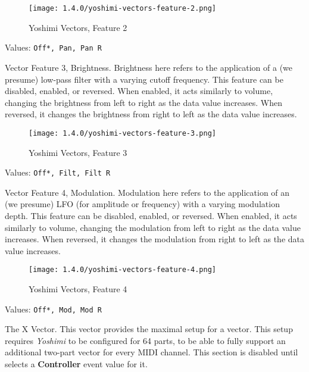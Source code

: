 \begin{figure}[H]
   \centering 
   \texttt{[image: 1.4.0/yoshimi-vectors-feature-2.png]}
   \caption{Yoshimi Vectors, Feature 2}
   \label{fig:yoshimi_vectors_feature_2}
\end{figure}

   Values: \texttt{Off*, Pan, Pan R}

   Vector Feature 3, Brightness.
   Brightness here refers to the application of a (we presume) low-pass filter
   with a varying cutoff frequency.
   This feature can be disabled, enabled, or reversed.
   When enabled, it acts similarly to volume, changing the brightness
   from left to right as the data value increases.
   When reversed, it changes the brightness from right to left as the data
   value increases.

\begin{figure}[H]
   \centering 
   \texttt{[image: 1.4.0/yoshimi-vectors-feature-3.png]}
   \caption{Yoshimi Vectors, Feature 3}
   \label{fig:yoshimi_vectors_feature_3}
\end{figure}

   Values: \texttt{Off*, Filt, Filt R}

   Vector Feature 4, Modulation.
   Modulation here refers to the application of an (we presume) LFO
   (for amplitude or frequency) with a varying modulation depth.
   This feature can be disabled, enabled, or reversed.
   When enabled, it acts similarly to volume, changing the modulation
   from left to right as the data value increases.
   When reversed, it changes the modulation from right to left as the data
   value increases.

\begin{figure}[H]
   \centering 
   \texttt{[image: 1.4.0/yoshimi-vectors-feature-4.png]}
   \caption{Yoshimi Vectors, Feature 4}
   \label{fig:yoshimi_vectors_feature_4}
\end{figure}

   Values: \texttt{Off*, Mod, Mod R}

   The X Vector.
   This vector provides the maximal setup for a vector.  This setup requires
   \textsl{Yoshimi} to be configured for 64 parts, to be able to fully support
   an additional two-part vector for every MIDI channel.  This section is
   disabled until selects a \textbf{Controller} event value for it.

